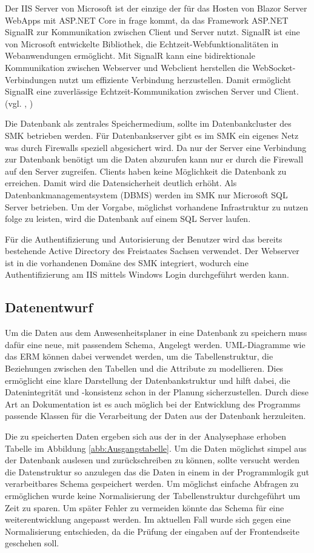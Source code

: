 Der IIS Server von Microsoft ist der einzige der für das Hosten von Blazor Server WebApps mit ASP.NET Core in frage kommt, da das Framework ASP.NET SignalR zur Kommunikation zwischen Client und Server nutzt. SignalR ist eine von Microsoft entwickelte Bibliothek, die Echtzeit-Webfunktionalitäten in Webanwendungen ermöglicht. Mit SignalR kann eine bidirektionale Kommunikation zwischen Webserver und Webclient herstellen die WebSocket-Verbindungen nutzt um effiziente Verbindung herzustellen. Damit ermöglicht SignalR eine zuverlässige Echtzeit-Kommunikation zwischen Server und Client. (vgl. \cite{SignalR}, \cite{SignalRPlatf})

Die Datenbank als zentrales Speichermedium, sollte im Datenbankcluster des SMK betrieben werden. Für Datenbankserver gibt es im SMK ein eigenes Netz was durch Firewalls speziell abgesichert wird. Da nur der Server eine Verbindung zur Datenbank benötigt um die Daten abzurufen kann nur er durch die Firewall auf den Server zugreifen. Clients haben keine Möglichkeit die Datenbank zu erreichen. Damit wird die Datensicherheit deutlich erhöht. Als Datenbankmanagementsystem (DBMS) werden im SMK nur Microsoft SQL Server betrieben. Um der Vorgabe, möglichst vorhandene Infrastruktur zu nutzen folge zu leisten, wird die Datenbank auf einem SQL Server laufen.

Für die Authentifizierung und Autorisierung der Benutzer wird das bereits bestehende Active Directory des Freistaates Sachsen verwendet. Der Webserver ist in die vorhandenen Domäne des SMK integriert, wodurch eine Authentifizierung am IIS mittels Windows Login durchgeführt werden kann.

\subsection{Datenentwurf}
\label{sec:Datenentwurf}
Um die Daten aus dem Anwesenheitsplaner in eine Datenbank zu speichern muss dafür eine neue, mit passendem Schema, Angelegt werden. UML-Diagramme wie das ERM können dabei verwendet werden, um die Tabellenstruktur, die Beziehungen zwischen den Tabellen und die Attribute zu modellieren. Dies ermöglicht eine klare Darstellung der Datenbankstruktur und hilft dabei, die Datenintegrität und -konsistenz schon in der Planung sicherzustellen. Durch diese Art an Dokumentation ist es auch möglich bei der Entwicklung des Programms passende Klassen für die Verarbeitung der Daten aus der Datenbank herzuleiten.

Die zu speicherten Daten ergeben sich aus der in der Analysephase erhoben Tabelle im Abbildung \ref{abb:Ausgangstabelle}. Um die Daten möglichst simpel aus der Datenbank auslesen und zurückschreiben zu können, sollte versucht werden die Datenstruktur so anzulegen das die Daten in einem in der Programmlogik gut verarbeitbares Schema gespeichert werden. Um möglichst einfache Abfragen zu ermöglichen wurde keine Normalisierung der Tabellenstruktur durchgeführt um Zeit zu sparen. Um später Fehler zu vermeiden könnte das Schema für eine weiterentwicklung angepasst werden. Im aktuellen Fall wurde sich gegen eine Normalisierung entschieden, da die Prüfung der eingaben auf der Frontendseite geschehen soll.

